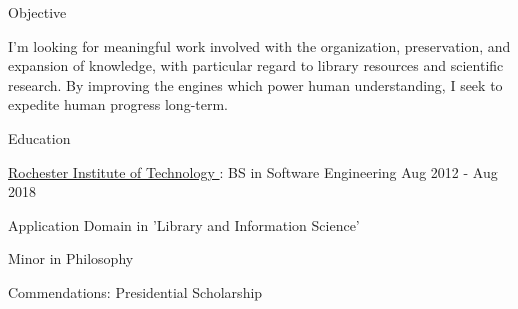 \documentclass{resume} %
\begin{document}

  \begin{rSection}{Objective}

    I'm looking for meaningful work involved with the organization, preservation, and expansion of knowledge, with particular regard to library resources and scientific research. By improving the engines which power human understanding, I seek to expedite human progress long-term.

  \end{rSection}


  \begin{rSection}{Education}

    \begin{rSubsection}{\underline{Rochester Institute of Technology }: BS in Software Engineering }{ Aug 2012 - Aug 2018 }{}

      \item Application Domain in 'Library and Information Science'

      \item Minor in Philosophy

      \item Commendations: Presidential Scholarship

    \end{rSubsection}

  \end{rSection}

\end{document}
